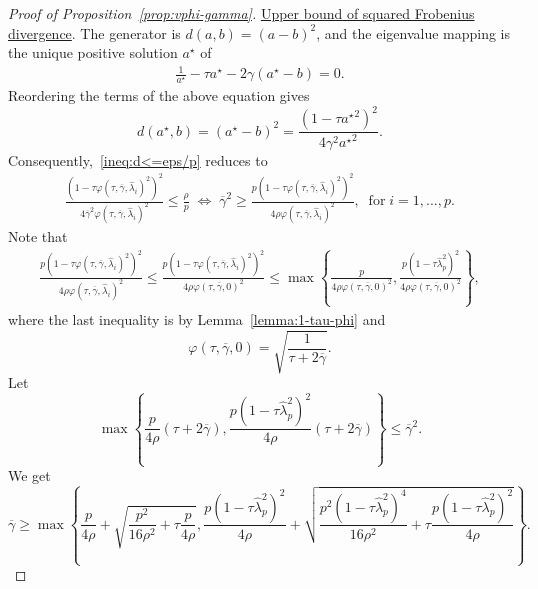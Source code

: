 \documentclass[11pt]{article}
\newcommand{\opt}{^\star}
\newcommand{\wh}{\widehat}
\begin{document}
\begin{proof}[Proof of Proposition~\ref{prop:vphi-gamma}]
    \underline{Upper bound of squared Frobenius divergence}. The generator is $d(a,b)=(a-b)^2$, and the eigenvalue mapping is the unique positive solution $a\opt$ of 
    \begin{align*}\label{eq:def-SF-solution-mapping}
        \frac{1}{a\opt}-\tau a\opt - 2\gamma(a\opt-b) = 0.
    \end{align*}
    Reordering the terms of the above equation gives
    \[
        d(a\opt,b)=(a\opt-b)^2 = \frac{(1-\tau {a\opt}^2)^2}{4\gamma^2{a\opt}^2}.
    \]
    Consequently,~\eqref{ineq:d<=eps/p} reduces to
    \begin{align*}\label{ineq:gamma-bar-W}
        \frac{(1-\tau \varphi(\tau,\overline{\gamma},\wh\lambda_i)^2)^2}{4\overline{\gamma}^2\varphi(\tau,\overline{\gamma},\wh\lambda_i)^2}
        \leq \frac{ \rho}{p}
        \;\Longleftrightarrow\;
        \overline{\gamma}^2\geq \frac{p(1-\tau \varphi(\tau,\overline{\gamma},\wh\lambda_i)^2)^2}{4 \rho\varphi(\tau,\overline{\gamma},\wh\lambda_i)^2}
        ,\;\; \text{for}\;  i=1,...,p.
    \end{align*}
    Note that
    \begin{align*}
        \frac{p(1-\tau \varphi(\tau,\overline{\gamma},\wh\lambda_i)^2)^2}{4 \rho\varphi(\tau,\overline{\gamma},\wh\lambda_i)^2} \leq \frac{p(1-\tau \varphi(\tau,\overline{\gamma},\wh\lambda_i)^2)^2}{4 \rho\varphi(\tau,\overline{\gamma},0)^2} \leq \max\left\{\frac{p}{4 \rho\varphi(\tau,\overline{\gamma},0)^2},\frac{p(1-\tau \wh\lambda_p^2)^2}{4 \rho\varphi(\tau,\overline{\gamma},0)^2}\right\},
    \end{align*}
    where the last inequality is by Lemma~\ref{lemma:1-tau-phi} and 
    \[
        \varphi(\tau,\overline{\gamma},0) = \sqrt{\frac{1}{\tau+2\overline{\gamma}}}.
    \]
    Let 
    \[
        \max\left\{\frac{p}{4 \rho}(\tau+2\overline{\gamma}),\frac{p(1-\tau \wh\lambda_p^2)^2}{4 \rho}(\tau+2\overline{\gamma})\right\} \leq \overline{\gamma}^2.
    \]
    We get
    \[
        \overline{\gamma} \geq \max\left\{\frac{p}{4\rho}+\sqrt{\frac{p^2}{16\rho^2}+\tau\frac{p}{4\rho}}, \frac{p(1-\tau\wh\lambda_p^2)^2}{4\rho}+\sqrt{\frac{p^2(1-\tau\wh\lambda_p^2)^4}{16\rho^2}+\tau\frac{p(1-\tau\wh\lambda_p^2)^2}{4\rho}}\right\}.
    \]


\end{proof}
\end{document}
